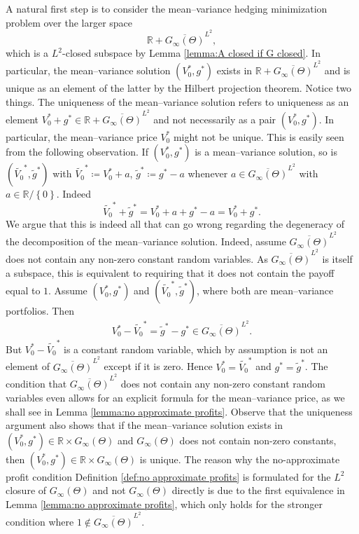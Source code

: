 \documentclass[11pt,a4paper,twoside,openany]{report}
\numberwithin{equation}{section}
\theoremstyle{plain} %
\theoremstyle{definition} %
\theoremstyle{remark} %
\begin{document}
A natural first step is to consider the mean--variance hedging minimization problem over the larger space 
\begin{equation*}
    \mathbb{R}+\overline{G_{\infty}(\Theta)}^{L^2},
\end{equation*}
which is a \(L^2\)-closed subspace by Lemma \ref{lemma:A closed if G closed}. In particular, the mean--variance solution \((V_0^*,g^*)\) exists in \(\mathbb{R}+\overline{G_{\infty}(\Theta)}^{L^2}\) and is unique as an element of the latter by the Hilbert projection theorem. Notice two things. The uniqueness of the mean--variance solution refers to uniqueness as an element \(V_0^*+g^*\in\mathbb{R}+\overline{G_{\infty}(\Theta)}^{L^2}\) and not necessarily as a pair  \((V_0^*,g^*)\). In particular, the mean--variance price \(V_0^*\) might not be unique. This is easily seen from the following observation. If  \((V_0^*,g^*)\) is a mean--variance solution, so is \((\widetilde{V_0}^*,\widetilde{g}^*)\) with \(\widetilde{V_0}^*\coloneqq V_0^*+a\), \(\widetilde{g}^*\coloneqq g^*-a\) whenever \(a\in\overline{G_{\infty}(\Theta)}^{L^2}\) with \(a\in\mathbb{R}/\left\{0\right\}\). Indeed
\begin{equation*}
    \widetilde{V_0}^*+\widetilde{g}^*=V_0^*+a+g^*-a=V_0^*+g^*.
\end{equation*}
 We argue that this is indeed all that can go wrong regarding the degeneracy of the decomposition of the mean--variance solution. Indeed, assume \(\overline{G_{\infty}(\Theta)}^{L^2}\) does not contain any non-zero constant random variables. As \(\overline{G_{\infty}(\Theta)}^{L^2}\) is itself a subspace, this is equivalent to requiring that it does not contain the payoff equal to \(1\). Assume  \((V_0^*,g^*)\) and \((\widetilde{V_0}^*,\widetilde{g}^*)\), where both are mean--variance portfolios. Then
\begin{align*}
    V_0^*-\widetilde{V_0}^*=\widetilde{g}^*-g^*\in\overline{G_{\infty}(\Theta)}^{L^2}.
\end{align*}
But \(V_0^*-\widetilde{V_0}^*\) is a constant random variable, which by assumption is not an element of \(\overline{G_{\infty}(\Theta)}^{L^2}\) except if it is zero. Hence \(V_0^*=\widetilde{V_0}^*\) and 
\(g^*=\widetilde{g}^*\). The condition that \(\overline{G_{\infty}(\Theta)}^{L^2}\) does not contain any non-zero constant random variables even allows for an explicit formula for the mean--variance price, as we shall see in Lemma \ref{lemma:no approximate profits}. Observe that the uniqueness argument also shows that if the mean--variance solution exists in \((V_0^*,g^*)\in\mathbb{R}\times G_{\infty}(\Theta)\) and \(G_{\infty}(\Theta)\) does not contain non-zero constants, then \((V_0^*,g^*)\in\mathbb{R}\times G_{\infty}(\Theta)\) is unique. The reason why the no-approximate profit condition Definition \ref{def:no approximate profits} is formulated for the \(L^2\) closure of \(G_{\infty}(\Theta)\) and not \(G_{\infty}(\Theta)\) directly is due to the first equivalence in Lemma \ref{lemma:no approximate profits}, which only holds for the stronger condition where \(1\notin\overline{G_{\infty}(\Theta)}^{L^2}\).
\end{document}
